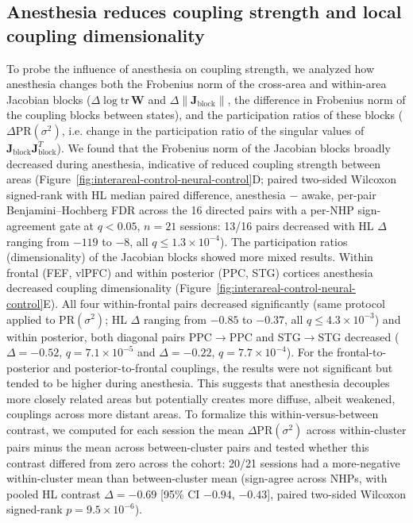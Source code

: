 \subsection{Anesthesia reduces coupling strength and local coupling dimensionality}
\label{sec:interareal-control-block-norm}

To probe the influence of anesthesia on coupling strength, we analyzed how anesthesia changes both the Frobenius norm of the cross-area and within-area Jacobian blocks ($\Delta\log\mathrm{tr}\,\mathbf{W}$ and $\Delta\|\mathbf{J}_{\mathrm{block}}\|$, the difference in Frobenius norm of the coupling blocks between states), and the participation ratios of these blocks ($\Delta\mathrm{PR}(\sigma^2)$, i.e. change in the participation ratio of the singular values of $\mathbf{J}_{\mathrm{block}}\mathbf{J}_{\mathrm{block}}^T$). We found that the Frobenius norm of the Jacobian blocks broadly decreased during anesthesia, indicative of reduced coupling strength between areas (Figure~\ref{fig:interareal-control-neural-control}D; paired two-sided Wilcoxon signed-rank with HL median paired difference, anesthesia $-$ awake, per-pair Benjamini--Hochberg FDR across the 16 directed pairs with a per-NHP sign-agreement gate at $q<0.05$, $n=21$ sessions: 13/16 pairs decreased with HL $\Delta$ ranging from $-119$ to $-8$, all $q\leq 1.3\!\times\!10^{-4}$). The participation ratios (dimensionality) of the Jacobian blocks showed more mixed results. Within frontal (FEF, vlPFC) and within posterior (PPC, STG) cortices anesthesia decreased coupling dimensionality (Figure~\ref{fig:interareal-control-neural-control}E). All four within-frontal pairs decreased significantly (same protocol applied to PR$(\sigma^2)$; HL $\Delta$ ranging from $-0.85$ to $-0.37$, all $q\leq 4.3\!\times\!10^{-3}$) and within posterior, both diagonal pairs PPC$\to$PPC and STG$\to$STG decreased ($\Delta=-0.52$, $q=7.1\!\times\!10^{-5}$ and $\Delta=-0.22$, $q=7.7\!\times\!10^{-4}$). For the frontal-to-posterior and posterior-to-frontal couplings, the results were not significant but tended to be higher during anesthesia. This suggests that anesthesia decouples more closely related areas but potentially creates more diffuse, albeit weakened, couplings across more distant areas. To formalize this within-versus-between contrast, we computed for each session the mean $\Delta\mathrm{PR}(\sigma^2)$ across within-cluster pairs minus the mean across between-cluster pairs and tested whether this contrast differed from zero across the cohort: 20/21 sessions had a more-negative within-cluster mean than between-cluster mean (sign-agree across NHPs, with pooled HL contrast $\Delta=-0.69$ [95\% CI $-0.94$, $-0.43$], paired two-sided Wilcoxon signed-rank $p=9.5\!\times\!10^{-6}$).

